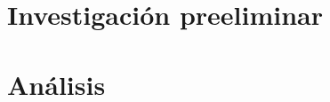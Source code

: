\documentclass[a4paper,12pt]{scrbook}
\begin{document}
\chapter{Investigación preeliminar}


\chapter{Análisis}


%
 
%

%
 
%

\appendix







\printindex
\end{document}
